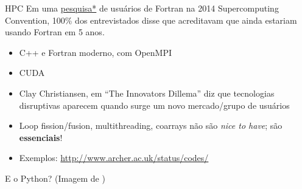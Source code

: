 \documentclass{beamer}
\begin{document}
\begin{darkframes}
    \begin{frame}{HPC}
    Em uma \href{https://software.intel.com/en-us/blogs/2015/03/27/doctor-fortran-in-the-future-of-fortran}{pesquisa*} de usuários de Fortran na 2014 Supercomputing Convention, 100\% dos entrevistados disse que acreditavam que ainda estariam usando Fortran em 5 anos.
    \begin{itemize}
    \item C++ e Fortran moderno, com OpenMPI
    \item CUDA
    \item Clay Christiansen, em ``The Innovators Dillema'' diz que tecnologias disruptivas aparecem quando surge um novo mercado/grupo de usuários
    \item Loop fission/fusion, multithreading, coarrays não são \emph{nice to have}; são \textbf{essenciais}!
    \item Exemplos: \url{http://www.archer.ac.uk/status/codes/}
    \end{itemize}
  \end{frame}
  
  \begin{frame}{E o Python? (Imagem de \cite{DataCamp})}
    \begin{center}
    \end{center}
  \end{frame}
  

\end{darkframes}
\end{document}
